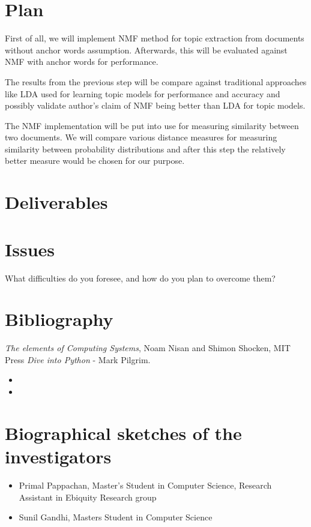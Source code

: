 \documentclass[a4paper,11pt]{article}
\begin{document}
\section{Plan}

First of all, we will implement NMF method for topic extraction from documents without anchor words assumption. Afterwards, this will be evaluated against NMF with anchor words for performance. 

The results from the previous step will be compare against traditional approaches like LDA used for learning topic models for performance and accuracy and possibly validate author's claim of NMF being better than LDA for topic models.

The NMF implementation will be put into use for measuring similarity between two documents. We will compare various distance measures for measuring similarity between probability distributions and after this step the relatively better measure would be chosen for our purpose.   

\section{Deliverables}


\section{Issues}
What difficulties do you foresee, and how do you plan to overcome them?

\section{Bibliography}
\begin{thebibliography}{99}
 \textit{The elements of Computing Systems}, Noam Nisan and Shimon Shocken, MIT Press
 \textit{Dive into Python} - Mark Pilgrim.
\end{thebibliography}


\begin{itemize}
\item
\item
\end{itemize}  

\section{Biographical sketches of the investigators}

\begin{itemize}
\item Primal Pappachan, Master's Student in Computer Science, Research Assistant in Ebiquity Research group
\item Sunil Gandhi, Masters Student in Computer Science
\end{itemize}
\end{document}
